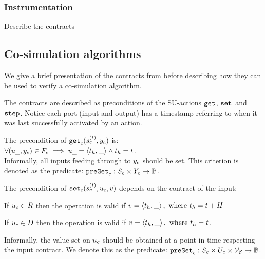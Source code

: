 \subsubsection{Instrumentation}

Describe the contracts

\subsection{Co-simulation algorithms}
We give a brief presentation of the contracts from \cite{Gomes2019a} before describing how they can be used to verify a co-simulation algorithm.


The contracts are described as preconditions of the SU-actions $\mathtt{get}_{}$, $\mathtt{set}_{}$ and $\mathtt{step}_{}$.
Notice each port (input and output) has a timestamp referring to when it was last successfully activated by an action. 

\begin{definition}\label{def:getout}  
  The precondition of $\mathtt{get}_{c}(s_{c}^{(t)}, y_{c})$ is: \\
  $\forall (u_{\_}, y_{c}) \in F_{c} \implies u_{\_} =  \left\langle t_h, \_ \right\rangle  \land t_h = t$.\\
  Informally, all inputs feeding through to $y_{c}$ should be set.
  This criterion is denoted as the predicate: $\mathtt{preGet}_{c}: S_{c} \times Y_{c} \to \mathbb{B}$.
\end{definition}

\begin{definition}\label{def:setin}
  The precondition of $\mathtt{set}_{c}(s_{c}^{(t)}, u_{c}, v)$ depends on the contract of the input:
  \begin{compactitem}
    \item If $u_{c} \in R$ then the operation is valid if $v=  \left\langle t_h,\_ \right\rangle , \textrm{ where } t_h = t+H$
    \item If $u_{c} \in D$ then the operation is valid if $v=  \left\langle t_h,\_ \right\rangle , \textrm{ where } t_h = t$.
  \end{compactitem} 
  Informally, the value set on $u_{c}$ should be obtained at a point in time respecting the input contract.
  We denote this as the predicate: $\mathtt{preSet}_{c}: S_{c} \times U_{c} \times \mathcal{V_{E}}  \to \mathbb{B}$.
  \end{definition}

